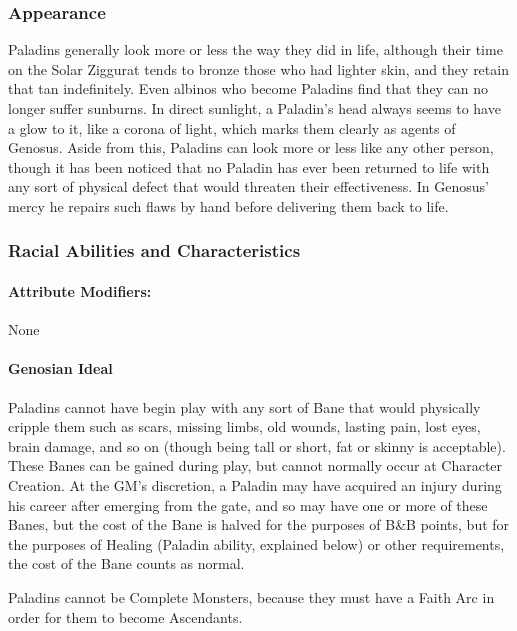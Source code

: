 \documentclass[oneside,11pt,english]{book}
\begin{document}
\subsubsection*{Appearance} 
Paladins generally look more or less the way they did in life, although their time on the Solar Ziggurat 
tends to bronze those who had lighter skin, and they retain that tan indefinitely. Even albinos who become 
Paladins find that they can no longer suffer sunburns. In direct sunlight, a Paladin's head always seems to 
have a glow to it, like a corona of light, which marks them clearly as agents of Genosus. Aside from this, 
Paladins can look more or less like any other person, though it has been noticed that no Paladin has ever 
been returned to life with any sort of physical defect that would threaten their effectiveness. In Genosus' 
mercy he repairs such flaws by hand before delivering them back to life. 
\subsubsection*{Racial Abilities and Characteristics} 
\paragraph{Attribute Modifiers:} None 
\paragraph{Genosian Ideal}
Paladins cannot have begin play with any sort of Bane that would physically cripple them such as 
scars, missing limbs, old wounds, lasting pain, lost eyes, brain damage, and so on (though being 
tall or short, fat or skinny is acceptable). These Banes can be gained during play, but cannot 
normally occur at Character Creation. At the GM's discretion, a Paladin may have acquired an 
injury during his career after emerging from the gate, and so may have one or more of these 
Banes, but the cost of the Bane is halved for the purposes of B\&B points, but for the purposes of 
Healing (Paladin ability, explained below) or other requirements, the cost of the Bane counts as normal. 


Paladins cannot be Complete Monsters, because they must have a Faith Arc in order for them to become Ascendants. 
\end{document}
